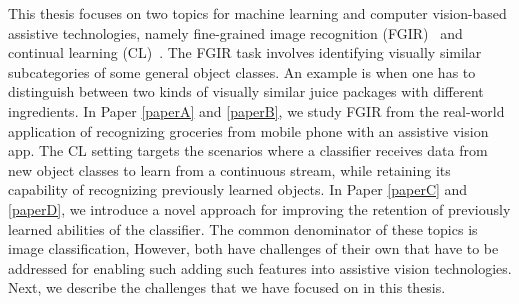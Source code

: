 This thesis focuses on two topics for machine learning and computer vision-based assistive technologies, namely fine-grained image recognition (FGIR)~\cite{wei2021fine} and continual learning (CL)~\cite{delange2021continual, parisi2019continual}. The FGIR task involves identifying visually similar subcategories of some general object classes. An example is when one has to distinguish between two kinds of visually similar juice packages with different ingredients. In Paper \ref{paperA} and \ref{paperB}, we study FGIR from the real-world application of recognizing groceries from mobile phone with an assistive vision app. The CL setting targets the scenarios where a classifier receives data from new object classes to learn from a continuous stream, while retaining its capability of recognizing previously learned objects. In Paper \ref{paperC} and \ref{paperD}, we introduce a novel approach for improving the retention of previously learned abilities of the classifier. The common denominator of these topics is image classification, However, both have challenges of their own that have to be addressed for enabling such adding such features into assistive vision technologies. Next, we describe the challenges that we have focused on in this thesis. 



